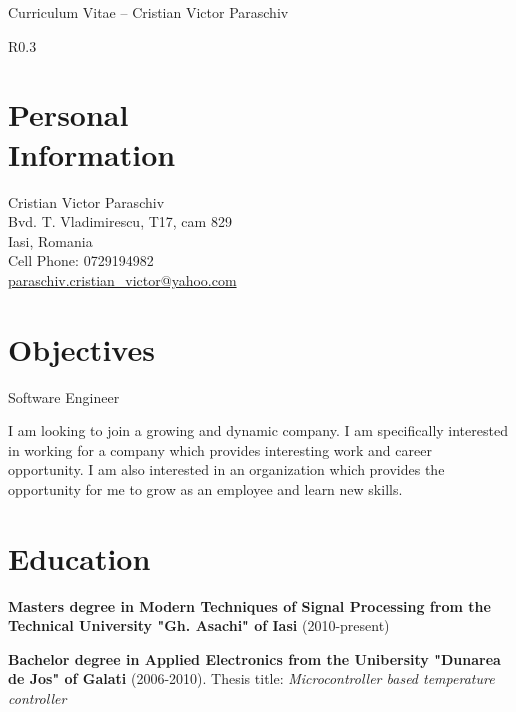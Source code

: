 \documentclass[margin,line,a4paper]{resume}
\begin{document}
{\sc \Large Curriculum Vitae -- Cristian Victor Paraschiv}
\begin{resume}
	\vspace{0.1cm}
	\begin{wrapfigure}{R}{0.3\textwidth}
        \vspace{-1cm}
       \begin{center}
       \end{center}
        \vspace{-1cm}
    \end{wrapfigure}
\section{\mysidestyle Personal\\Information}%
   	Cristian Victor Paraschiv\\
   	Bvd. T. Vladimirescu, T17, cam 829\\
   	Iasi, Romania\\
   	Cell Phone: 0729194982\\
   	\href{mailto:paraschiv.cristian\_victor@yahoo.com}{paraschiv.cristian\_victor@yahoo.com}
   	
\section{\mysidestyle Objectives}%
	Software Engineer
	
	I am looking to join a growing and dynamic company. I am specifically interested in working for a company which provides interesting work and career opportunity. I am also interested in an organization which provides the opportunity for me to grow as an employee and learn new skills.
\section{\mysidestyle Education}
	\textbf{Masters degree in Modern Techniques of Signal Processing from the Technical University "Gh. Asachi" of Iasi} (2010-present)
	
	\textbf{Bachelor degree in Applied Electronics from the Unibersity "Dunarea de Jos" of Galati} (2006-2010). Thesis title: \textit{Microcontroller based temperature controller}


\end{resume}
\end{document}
